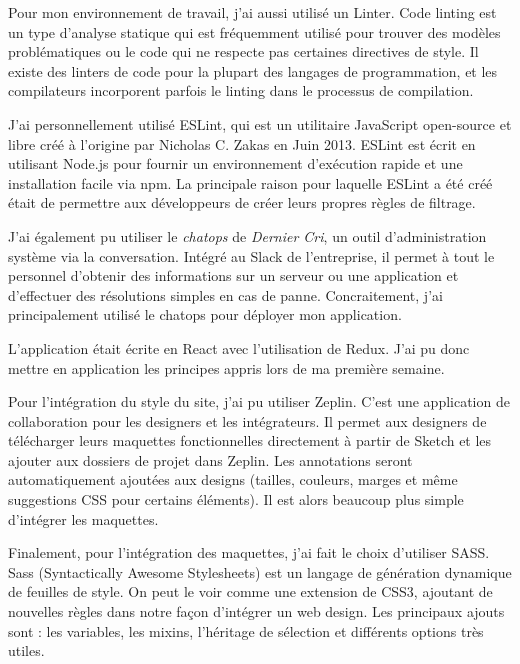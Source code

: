 \documentclass[12pt,a4paper]{article}
\begin{document}
  \bigskip

  Pour mon environnement de travail, j'ai aussi utilisé un Linter. Code
  linting est un type d'analyse statique qui est fréquemment utilisé pour
  trouver des modèles problématiques ou le code qui ne respecte pas
  certaines directives de style. Il existe des linters de code pour la
  plupart des langages de programmation, et les compilateurs incorporent
  parfois le linting dans le processus de compilation.

  \bigskip

  J'ai personnellement utilisé ESLint, qui est un utilitaire JavaScript
  open-source et libre créé à l'origine par Nicholas C. Zakas en Juin
  2013. ESLint est écrit en utilisant Node.js pour fournir un
  environnement d'exécution rapide et une installation facile via npm. La
  principale raison pour laquelle ESLint a été créé était de permettre aux
  développeurs de créer leurs propres règles de filtrage.

  \bigskip

  J'ai également pu utiliser le \emph{chatops} de \emph{Dernier Cri}, un
  outil d'administration système via la conversation. Intégré au Slack de
  l'entreprise, il permet à tout le personnel d'obtenir des informations
  sur un serveur ou une application et d'effectuer des résolutions simples
  en cas de panne. Concraitement, j'ai principalement utilisé le chatops
  pour déployer mon application.

  \bigskip

  L'application était écrite en React avec l'utilisation de Redux. J'ai pu
  donc mettre en application les principes appris lors de ma première
  semaine.

  \bigskip

  Pour l'intégration du style du site, j'ai pu utiliser Zeplin. C'est une
  application de collaboration pour les designers et les intégrateurs. Il
  permet aux designers de télécharger leurs maquettes fonctionnelles
  directement à partir de Sketch et les ajouter aux dossiers de projet
  dans Zeplin. Les annotations seront automatiquement ajoutées aux designs
  (tailles, couleurs, marges et même suggestions CSS pour certains
  éléments). Il est alors beaucoup plus simple d'intégrer les maquettes.

  \bigskip

  Finalement, pour l'intégration des maquettes, j'ai fait le choix
  d'utiliser SASS. Sass (Syntactically Awesome Stylesheets) est un langage
  de génération dynamique de feuilles de style. On peut le voir comme une
  extension de CSS3, ajoutant de nouvelles règles dans notre façon
  d'intégrer un web design. Les principaux ajouts sont : les variables,
  les mixins, l'héritage de sélection et différents options très utiles.
\end{document}
